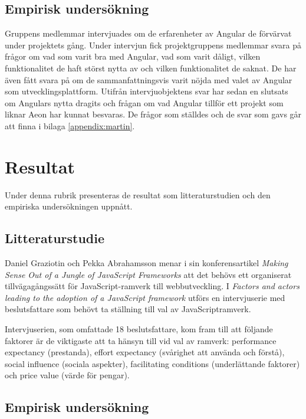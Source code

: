 \subsection{Empirisk undersökning} 

Gruppens medlemmar intervjuades om de erfarenheter av Angular de förvärvat under projektets gång. Under intervjun fick projektgruppens medlemmar svara på frågor om vad som varit bra med Angular, vad som varit dåligt, vilken funktionalitet de haft störst nytta av och vilken funktionalitet de saknat. De har även fått svara på om de sammanfattningsvis varit nöjda med valet av Angular som utvecklingsplattform. Utifrån intervjuobjektens svar har sedan en slutsats om Angulars nytta dragits och frågan om vad Angular tillför ett projekt som liknar Aeon har kunnat besvaras. De frågor som ställdes och de svar som gavs går att finna i bilaga \ref{appendix:martin}.

\section{Resultat}

Under denna rubrik presenteras de resultat som litteraturstudien och den empiriska undersökningen uppnått.

\subsection{Litteraturstudie}

Daniel Graziotin och Pekka Abrahamsson menar i sin konferensartikel \textit{Making Sense Out of a Jungle of JavaScript Frameworks} \cite{making_sense} att det behövs ett organiserat tillvägagångssätt för JavaScript-ramverk till webbutveckling. I \textit{Factors and actors leading to the adoption of a JavaScript framework} \cite{js_framework} utförs en intervjuserie med beslutsfattare som behövt ta ställning till val av JavaScriptramverk.

Intervjuserien, som omfattade 18 beslutsfattare, kom fram till att följande faktorer är de viktigaste att ta hänsyn till vid val av ramverk: performance expectancy (prestanda), effort expectancy (svårighet att använda och förstå), social influence (sociala aspekter), facilitating conditions (underlättande faktorer) och price value (värde för pengar).



\subsection{Empirisk undersökning}

